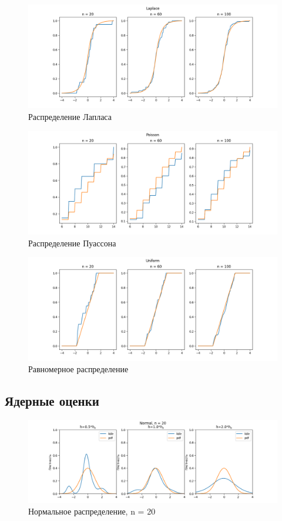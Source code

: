 \documentclass[12pt]{article}
\begin{document}
\begin{figure}[h!]
  \centering
  \includegraphics[width=0.8\paperwidth ]{images/edf/Laplace.png}
  \caption{Распределение Лапласа}
\end{figure}

\begin{figure}[h!]
  \centering
  \includegraphics[width=0.8\paperwidth ]{images/edf/Poisson.png}
  \caption{Распределение Пуассона}
\end{figure}

\begin{figure}[h!]
  \centering
  \includegraphics[width=0.8\paperwidth ]{images/edf/Uniform.png}
  \caption{Равномерное распределение}
\end{figure}

\FloatBarrier
\subsection{Ядерные оценки}
\begin{figure}[h!]
  \centering
  \includegraphics[width=0.8\paperwidth ]{images/kde/Normal_20.png}
  \caption{Нормальное распределение, n = 20}
\end{figure}
\end{document}
